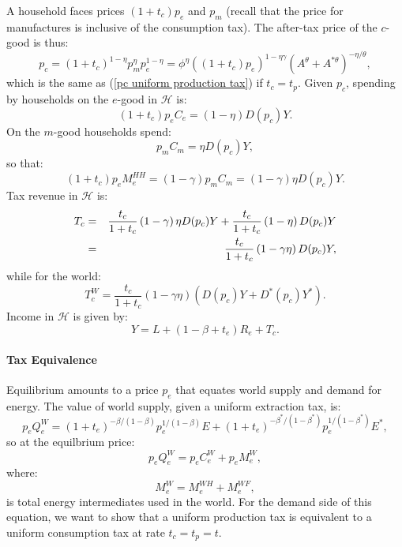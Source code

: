 \documentclass[notitlepage,12pt]{article}
\begin{document}
A household faces prices $(1+t_{c})p_{e}$ and $p_{m}$ (recall that the price
for manufactures is inclusive of the consumption tax). The after-tax price
of the $c$-good is thus:%
\begin{equation*}
p_{c}=(1+t_{c})^{1-\eta }p_{m}^{\eta }p_{e}^{1-\eta }=\phi ^{\eta }\left(
(1+t_{c})p_{e}\right) ^{1-\eta \gamma }\left( A^{\theta }+A^{\ast \theta
}\right) ^{-\eta /\theta },
\end{equation*}%
which is the same as (\ref{pc uniform production tax}) if $t_{c}=t_{p}$.
Given $p_{c}$, spending by households on the $e$-good in $\mathcal{H}$ is:%
\begin{equation*}
(1+t_{c})p_{e}C_{e}=\left( 1-\eta \right) D(p_{c})Y.
\end{equation*}%
On the $m$-good households spend:%
\begin{equation*}
p_{m}C_{m}=\eta D(p_{c})Y,
\end{equation*}%
so that:%
\begin{equation*}
(1+t_{c})p_{e}M_{e}^{HH}=\left( 1-\gamma \right) p_{m}C_{m}=\left( 1-\gamma
\right) \eta D(p_{c})Y.
\end{equation*}%
Tax revenue in $\mathcal{H}$ is:%
\begin{eqnarray*}
T_{c} &=&\frac{t_{c}}{1+t_{c}}\left( 1-\gamma \right) \eta D(p_{c})Y+\frac{%
t_{c}}{1+t_{c}}\left( 1-\eta \right) D(p_{c})Y \\
&=&\frac{t_{c}}{1+t_{c}}\left( 1-\gamma \eta \right) D(p_{c})Y,
\end{eqnarray*}%
while for the world:%
\begin{equation*}
T_{c}^{W}=\frac{t_{c}}{1+t_{c}}\left( 1-\gamma \eta \right) \left(
D(p_{c})Y+D^{\ast }(p_{c})Y^{\ast }\right) .
\end{equation*}%
Income in $\mathcal{H}$ is given by:%
\begin{equation*}
Y=L+\left( 1-\beta +t_{e}\right) R_{e}+T_{c}.
\end{equation*}

\paragraph{Tax Equivalence}

Equilibrium amounts to a price $p_{e}$ that equates world supply and demand
for energy. The value of world supply, given a uniform extraction tax, is:%
\begin{equation*}
p_{e}Q_{e}^{W}=\left( 1+t_{e}\right) ^{-\beta /(1-\beta )}p_{e}^{1/(1-\beta
)}E+\left( 1+t_{e}\right) ^{-\beta ^{\ast }/(1-\beta ^{\ast
})}p_{e}^{1/(1-\beta ^{\ast })}E^{\ast },
\end{equation*}%
so at the equilbrium price:%
\begin{equation*}
p_{e}Q_{e}^{W}=p_{e}C_{e}^{W}+p_{e}M_{e}^{W},
\end{equation*}%
where:%
\begin{equation*}
M_{e}^{W}=M_{e}^{WH}+M_{e}^{WF},
\end{equation*}%
is total energy intermediates used in the world. For the demand side of this
equation, we want to show that a uniform production tax is equivalent to a
uniform consumption tax at rate $t_{c}=t_{p}=t$.
\end{document}
